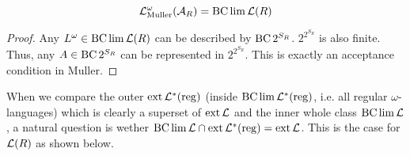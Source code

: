 \begin{lemma}
\label{gen:lang_omega_muller}
\[ \mathcal{L}^\omega_{\text{Muller}}(\mathcal{A}_R) = \operatorname{BC} \lim \mathcal{L}(R) \]
\begin{proof}
Any $L^\omega \in \operatorname{BC} \lim \mathcal{L}(R)$ can be described by $\operatorname{BC} 2^{S_R}$. $2^{2^{S_R}}$ is also finite. Thus, any $A \in \operatorname{BC} 2^{S_R}$ can be represented in $2^{2^{S_R}}$. This is exactly an acceptance condition in Muller.
\end{proof}
\end{lemma}


When we compare the outer $\operatorname{ext} \mathcal{L}^*(\textup{\textrm{reg}})$ (inside $\operatorname{BC} \lim \mathcal{L}^*(\textup{\textrm{reg}})$, i.e. all regular $\omega$-languages) which is clearly a superset of $\operatorname{ext} \mathcal{L}$ and the inner whole class $\operatorname{BC} \lim \mathcal{L}$, a natural question is wether $\operatorname{BC} \lim \mathcal{L} \cap \operatorname{ext} \mathcal{L}^*(\textup{\textrm{reg}}) = \operatorname{ext} \mathcal{L}$. This is the case for $\mathcal{L}(R)$ as shown below.

